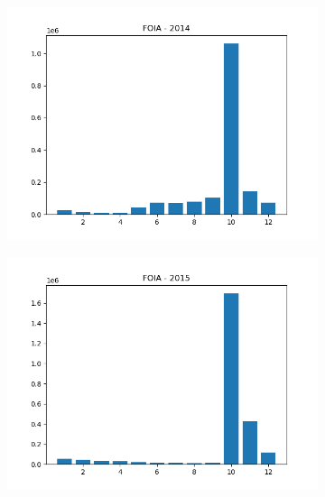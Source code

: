 \documentclass{article}
\begin{document}
\begin{figure}[H]
\begin{subfigure}{.5\textwidth}
    \end{subfigure}
    \begin{subfigure}{.5\textwidth}
        \centering
        \includegraphics[width=\textwidth]{../../output/figures/annual_source_distribution/FOIA_data_dist_2014.png}
    \end{subfigure}
    \begin{subfigure}{.5\textwidth}
        \centering
        \includegraphics[width=\textwidth]{../../output/figures/annual_source_distribution/FOIA_data_dist_2015.png}
    \end{subfigure}
    \begin{subfigure}{.5\textwidth}
        \centering

\end{subfigure}
\end{figure}
\end{document}
